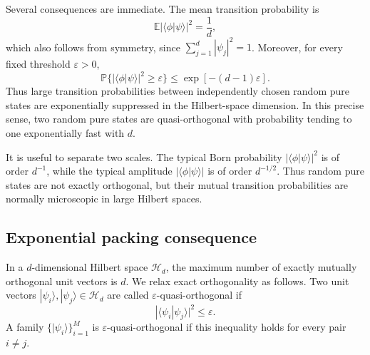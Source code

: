 \documentclass[aps,pra,reprint,superscriptaddress,nofootinbib,longbibliography]{revtex4-2}
\newcommand{\ket}[1]{| #1 \rangle}
\newcommand{\eps}{\varepsilon}
\newcommand{\HH}{\mathcal{H}}
\newcommand{\E}{\mathbb{E}}
\newcommand{\PP}{\mathbb{P}}
\begin{document}
Several consequences are immediate.  The mean transition probability is
\begin{equation}
    \E |\langle\phi|\psi\rangle|^2
    =
    \frac{1}{d},
    \label{eq:mean-transition-probability}
\end{equation}
which also follows from symmetry, since $\sum_{j=1}^d|\psi_j|^2=1$. Moreover,
for every fixed threshold $\eps>0$,
\begin{equation}
    \PP\{ |\langle\phi|\psi\rangle|^2\geq\eps\}
    \leq
    \exp[-(d-1)\eps] .
    \label{eq:large-transition-probability-suppressed}
\end{equation}
Thus large transition probabilities between independently chosen random pure
states are exponentially suppressed in the Hilbert-space dimension. In this
precise sense, two random pure states are quasi-orthogonal with probability
tending to one exponentially fast with $d$.

It is useful to separate two scales.  The typical Born probability
$|\langle\phi|\psi\rangle|^2$ is of order $d^{-1}$, while the typical amplitude
$|\langle\phi|\psi\rangle|$ is of order $d^{-1/2}$. Thus random pure states are
not exactly orthogonal, but their mutual transition probabilities are normally
microscopic in large Hilbert spaces.

\subsection*{Exponential packing consequence}

In a $d$-dimensional Hilbert space $\HH_d$, the maximum number of exactly
mutually orthogonal unit vectors is $d$.  We relax exact orthogonality as
follows. Two unit vectors $\ket{\psi_i},\ket{\psi_j}\in\HH_d$ are called
$\eps$-quasi-orthogonal if
\begin{equation}
    |\langle\psi_i|\psi_j\rangle|^2 \le \eps .
\end{equation}
A family $\{\ket{\psi_i}\}_{i=1}^{M}$ is $\eps$-quasi-orthogonal if this
inequality holds for every pair $i\ne j$.
\end{document}

